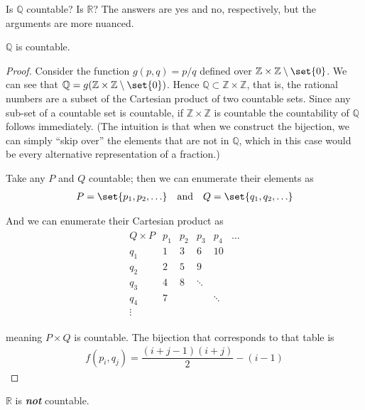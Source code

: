 \documentclass{article}
\begin{document}
Is $\mathbb{Q}$ countable? Is $\mathbb{R}$? The answers are yes and no, respectively, but the arguments are more nuanced.
\begin{claim}
  $\mathbb{Q}$ is countable.
\end{claim}

\begin{proof}
  Consider the function $g(p, q) = p / q$ defined over $\mathbb{Z} \times \mathbb{Z}\setminus\set{0}$. We can see that $\mathbb{Q} = g(\mathbb{Z} \times \mathbb{Z}\setminus\set{0})$. Hence $\mathbb{Q} \subset \mathbb{Z} \times \mathbb{Z}$, that is, the rational numbers are a subset of the Cartesian product of two countable sets. Since any sub-set of a countable set is countable, if $\mathbb{Z} \times \mathbb{Z}$ is countable the countability of $\mathbb{Q}$ follows immediately. (The intuition is that when we construct the bijection, we can simply ``skip over'' the elements that are not in $\mathbb{Q}$, which in this case would be every alternative representation of a fraction.)

  Take any $P$ and $Q$ countable; then we can enumerate their elements as
  \begin{align*}
    P = \set{p_1, p_2, \ldots}
    \quad
    \text{and}
    \quad
    Q = \set{q_1, q_2, \ldots}
  \end{align*}

  And we can enumerate their Cartesian product as
  \begin{align*}
    \begin{matrix}
      Q \times P & p_1 & p_2 & p_3    & p_4    & \ldots \\
      q_1        & 1   & 3   & 6      & 10     &        \\
      q_2        & 2   & 5   & 9      &        &        \\
      q_3        & 4   & 8   & \ddots &        &        \\
      q_4        & 7   &     &        & \ddots &        \\
      \vdots
    \end{matrix}
  \end{align*}

  meaning $P \times Q$ is countable. The bijection that corresponds to that table is
  \begin{align*}
    f(p_i, q_j) = \dfrac{(i + j - 1)(i + j)}{2} - (i - 1)
  \end{align*}
\end{proof}

\begin{claim}
  $\mathbb{R}$ is \textbf{\textit{not}} countable.
\end{claim}
\end{document}
